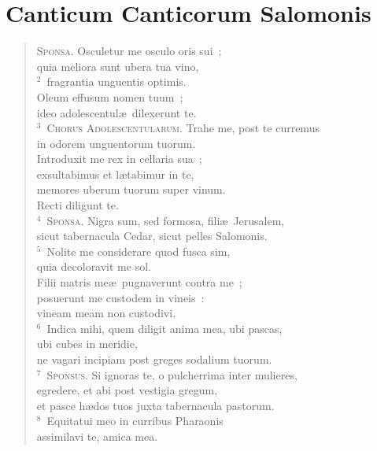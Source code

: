 {\centering \section*{Canticum Canticorum Salomonis}}\thispagestyle{empty}

\begin{flushleft}\begin{verse}\vspace{-11pt}\textsc{Sponsa.} Osculetur me osculo oris sui~;\\ quia meliora sunt ubera tua vino,\\
${}^{2}$~fragrantia unguentis optimis.\\ Oleum effusum nomen tuum~;\\ ideo adolescentul\ae\ dilexerunt te.\\
${}^{3}$~\textsc{Chorus Adolescentularum.} Trahe me, post te curremus\\ in odorem unguentorum tuorum.\\ Introduxit me rex in cellaria sua~;\\ exsultabimus et l\ae tabimur in te,\\ memores uberum tuorum super vinum.\\ Recti diligunt te.\\
${}^{4}$~\textsc{Sponsa.} Nigra sum, sed formosa, fili\ae\ Jerusalem,\\ sicut tabernacula Cedar, sicut pelles Salomonis.\\
${}^{5}$~Nolite me considerare quod fusca sim,\\ quia decoloravit me sol.\\ Filii matris me\ae\ pugnaverunt contra me~;\\ posuerunt me custodem in vineis~:\\ vineam meam non custodivi.\\
${}^{6}$~Indica mihi, quem diligit anima mea, ubi pascas,\\ ubi cubes in meridie,\\ ne vagari incipiam post greges sodalium tuorum.\\
${}^{7}$~\textsc{Sponsus.} Si ignoras te, o pulcherrima inter mulieres,\\ egredere, et abi post vestigia gregum,\\ et pasce h\ae dos tuos juxta tabernacula pastorum.\\
${}^{8}$~Equitatui meo in curribus Pharaonis\\ assimilavi te, amica mea.\\

\end{verse}
\end{flushleft}
